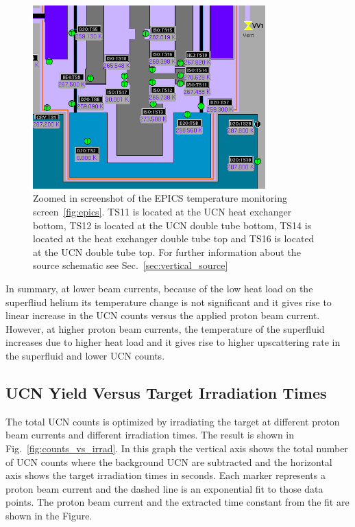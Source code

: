 \begin{figure}[h!]
  \centering
  \includegraphics[width=0.8\textwidth]{TSs.png}
  \caption{Zoomed in screenshot of the EPICS temperature monitoring
    screen~\ref{fig:epics}. TS11 is located at the UCN heat exchanger
    bottom, TS12 is located at the UCN double tube bottom, TS14 is
    located at the heat exchanger double tube top and TS16 is located
    at the UCN double tube top. For further information about the
    source schematic see Sec.~\ref{sec:vertical_source} }
  \label{fig:TSs}
\end{figure}

In summary, at lower beam currents, because of the low heat load on the
superfliud helium its temperature change is not significant and it
gives rise to linear increase in the UCN counts versus the applied
proton beam current. However, at higher proton beam currents, the
temperature of the superfluid increases due to higher heat load and it
gives rise to higher upscattering rate in the superfluid and lower UCN
counts.


\subsection{UCN Yield Versus Target Irradiation Times}
The total UCN counts is optimized by irradiating the target at
different proton beam currents and different irradiation times. The
result is shown in Fig.~\ref{fig:counts_vs_irrad}.  In this graph the
vertical axis shows the total number of UCN counts where the
background UCN are subtracted and the horizontal axis shows the target
irradiation times in seconds. Each marker represents a proton beam
current and the dashed line is an exponential fit to those data
points. The proton beam current and the extracted time constant from
the fit are shown in the Figure.


